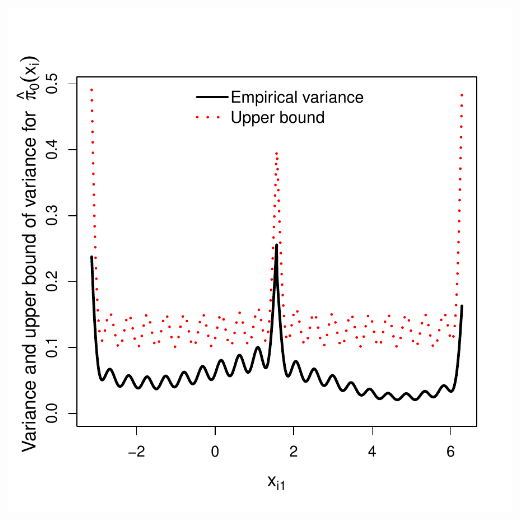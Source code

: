 \documentclass{article}\usepackage[]{graphicx}\usepackage[]{color}
\makeatletter
\def\maxwidth{ %
  \ifdim\Gin@nat@width>\linewidth
    \linewidth
  \else
    \Gin@nat@width
  \fi
}
\newenvironment{knitrout}{}{} %
\makeatother
\begin{document}
\begin{knitrout}
{\centering \includegraphics[width=\maxwidth]{figures/Fig2e-1} 

}



\end{knitrout}
\end{document}
